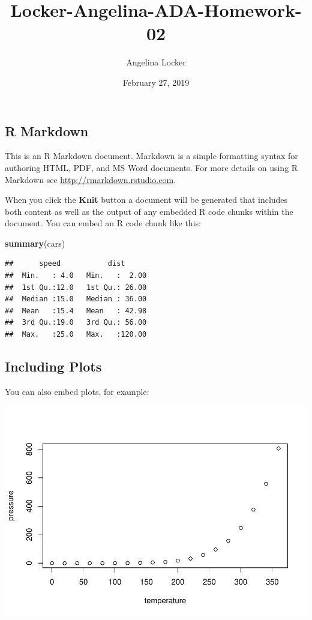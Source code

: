 \documentclass[]{article}
\title{Locker-Angelina-ADA-Homework-02}
\author{Angelina Locker}
\date{February 27, 2019}
\newenvironment{Shaded}{\begin{snugshade}}{\end{snugshade}}
\newcommand{\KeywordTok}[1]{\textcolor[rgb]{0.13,0.29,0.53}{\textbf{#1}}}
\newcommand{\NormalTok}[1]{#1}
\begin{document}
\maketitle

\subsection{R Markdown}\label{r-markdown}

This is an R Markdown document. Markdown is a simple formatting syntax
for authoring HTML, PDF, and MS Word documents. For more details on
using R Markdown see \url{http://rmarkdown.rstudio.com}.

When you click the \textbf{Knit} button a document will be generated
that includes both content as well as the output of any embedded R code
chunks within the document. You can embed an R code chunk like this:

\begin{Shaded}
\begin{Highlighting}[]
\KeywordTok{summary}\NormalTok{(cars)}
\end{Highlighting}
\end{Shaded}

\begin{verbatim}
##      speed           dist       
##  Min.   : 4.0   Min.   :  2.00  
##  1st Qu.:12.0   1st Qu.: 26.00  
##  Median :15.0   Median : 36.00  
##  Mean   :15.4   Mean   : 42.98  
##  3rd Qu.:19.0   3rd Qu.: 56.00  
##  Max.   :25.0   Max.   :120.00
\end{verbatim}

\subsection{Including Plots}\label{including-plots}

You can also embed plots, for example:

\includegraphics{Locker-Angelina-ADA-Homework-02_files/figure-latex/pressure-1.pdf}
\end{document}
